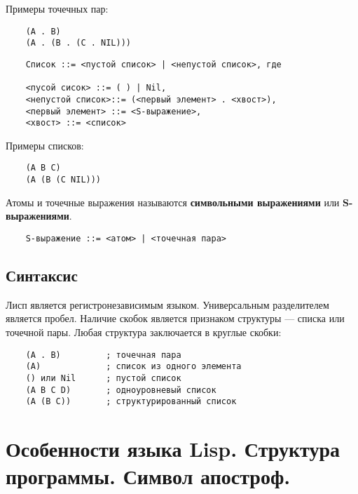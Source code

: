 Примеры точечных пар:
\begin{lstlisting}
    (A . B)
    (A . (B . (C . NIL)))
\end{lstlisting}


\begin{lstlisting}
    Список ::= <пустой список> | <непустой список>, где
                
    <пусой сисок> ::= ( ) | Nil,
    <непустой список>::= (<первый элемент> . <хвост>),
    <первый элемент> ::= <S-выражение>,
    <хвост> ::= <список>
\end{lstlisting}

Примеры списков:
\begin{lstlisting}
    (A B C)
    (A (B (C NIL)))
\end{lstlisting}

Атомы и точечные выражения называются \textbf{символьными выражениями} или \textbf{S-выражениями}.
\begin{lstlisting}
    S-выражение ::= <атом> | <точечная пара>
\end{lstlisting}


\subsection*{Синтаксис}

Лисп является регистронезависимым языком. Универсальным разделителем является пробел. Наличие скобок является признаком структуры --- списка или точечной пары. Любая структура заключается в круглые скобки:
\begin{lstlisting}
    (A . B)         ; точечная пара
    (A)             ; список из одного элемента
    () или Nil      ; пустой список
    (A B C D)       ; одноуровневый список
    (A (B C))       ; структурированный список
\end{lstlisting}

\section{Особенности языка Lisp. Структура программы. Символ апостроф.}

